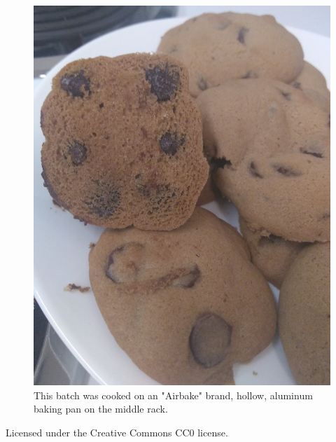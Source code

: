 \documentclass[12pt, letterpaper]{article}
\begin{document}
\begin{flushleft}


\begin{figure}[H]
\begin{center}
\includegraphics[width=0.6\linewidth]{./pics/cookies.jpg}
\caption{This batch was cooked on an "Airbake" brand, hollow, aluminum baking pan on the middle rack.}
\end{center}
\end{figure}

Licensed under the Creative Commons CC0 license.

\end{flushleft}
\end{document}
